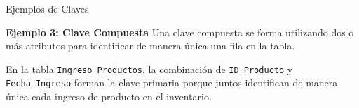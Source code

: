 \documentclass[spanish]{beamer}
\begin{document}
\begin{frame}{Ejemplos de Claves}
    \begin{tcolorbox}[title=Ejemplos de Claves,colback=gray!5!white,colframe=gray!75!black]
        
        \textbf{Ejemplo 3: Clave Compuesta}  
         Una clave compuesta se forma utilizando dos o más atributos para identificar de manera única una fila en la tabla.  
        
        En la tabla \texttt{Ingreso\_Productos}, la combinación de \texttt{ID\_Producto} y \texttt{Fecha\_Ingreso} forman la clave primaria porque juntos identifican de manera única cada ingreso de producto en el inventario.


        \begin{table}[]
            \centering

            \caption{Ejemplo de Clave Compuesta}
        \end{table}

 
    \end{tcolorbox}
\end{frame}
\end{document}
